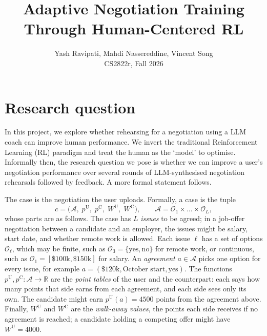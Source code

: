 \documentclass[11pt]{article}
\title{\vspace{-2.2em}Adaptive Negotiation Training Through Human-Centered RL}
\author{Yash Ravipati, Mahdi Nassereddine, Vincent Song \\ \small CS2822r, Fall 2026}
\date{\vspace{-1.2em}}
\makeatletter
\renewcommand\paragraph{\@startsection{paragraph}{4}{\z@}{0.7ex \@plus 0.3ex}{-1em}{\normalfont\normalsize\bfseries}}
\makeatother
\begin{document}
\maketitle

\section{Research question}

In this project, we explore whether rehearsing for a negotiation using a LLM coach can improve human performance. We invert the traditional Reinforcement Learning (RL) paradigm and treat the human as the `model' to optimise. Informally then, the research question we pose is whether we can improve a user's negotiation performance over several rounds of LLM-synthesised negotiation rehearsals followed by feedback. A more formal statement follows.

\paragraph{1. The case $c$.}
The case is the negotiation the user uploads. Formally, a case is the tuple
\begin{equation}
c = \big( \mathcal{A},\; p^{\mathrm{U}},\; p^{\mathrm{C}},\; W^{\mathrm{U}},\; W^{\mathrm{C}} \big), \qquad \mathcal{A} = \mathcal{O}_1 \times \dots \times \mathcal{O}_L,
\end{equation}
whose parts are as follows. The case has $L$ \emph{issues} to be agreed; in a job-offer negotiation between a candidate and an employer, the issues might be salary, start date, and whether remote work is allowed. Each issue $\ell$ has a set of options $\mathcal{O}_\ell$, which may be finite, such as $\mathcal{O}_3 = \{\text{yes}, \text{no}\}$ for remote work, or continuous, such as $\mathcal{O}_1 = [\$100\text{k}, \$150\text{k}]$ for salary. An \emph{agreement} $a \in \mathcal{A}$ picks one option for every issue, for example $a = (\$120\text{k}, \text{October start}, \text{yes})$. The functions $p^{\mathrm{U}}, p^{\mathrm{C}} : \mathcal{A} \to \mathbb{R}$ are the \emph{point tables} of the user and the counterpart: each says how many points that side earns from each agreement, and each side sees only its own. The candidate might earn $p^{\mathrm{U}}(a) = 4500$ points from the agreement above. Finally, $W^{\mathrm{U}}$ and $W^{\mathrm{C}}$ are the \emph{walk-away values}, the points each side receives if no agreement is reached; a candidate holding a competing offer might have $W^{\mathrm{U}} = 4000$.
\end{document}
